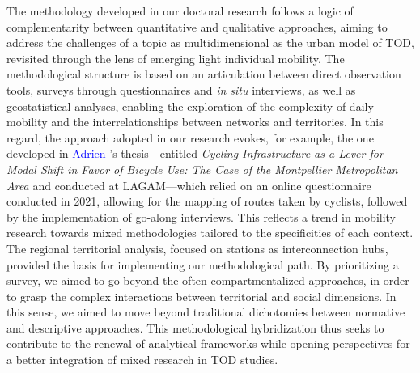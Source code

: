 \begin{refsegment}
The methodology developed in our doctoral research follows a logic of complementarity between quantitative and qualitative approaches, aiming to address the challenges of a topic as multidimensional as the urban model of \acrshort{TOD}, revisited through the lens of emerging light individual mobility. The methodological structure is based on an articulation between direct observation tools, surveys through questionnaires and \textsl{in situ} interviews, as well as geostatistical analyses, enabling the exploration of the complexity of daily mobility and the interrelationships between networks and territories. In this regard, the approach adopted in our research evokes, for example, the one developed in \textcolor{blue}{Adrien} \textcolor{blue}{\textcite{poisson_amenagements_2019}}’s thesis—entitled \textsl{Cycling Infrastructure as a Lever for Modal Shift in Favor of Bicycle Use: The Case of the Montpellier Metropolitan Area} and conducted at \acrfull{LAGAM}—which relied on an online questionnaire conducted in 2021, allowing for the mapping of routes taken by cyclists, followed by the implementation of go-along interviews. This reflects a trend in mobility research towards mixed methodologies tailored to the specificities of each context. The regional territorial analysis, focused on stations as interconnection hubs, provided the basis for implementing our methodological path. By prioritizing a  survey, we aimed to go beyond the often compartmentalized  approaches, in order to grasp the complex interactions between territorial and social dimensions. In this sense, we aimed to move beyond traditional dichotomies between normative and descriptive approaches. This methodological hybridization thus seeks to contribute to the renewal of analytical frameworks while opening perspectives for a better integration of mixed research in \acrshort{TOD} studies.%


\end{refsegment}
